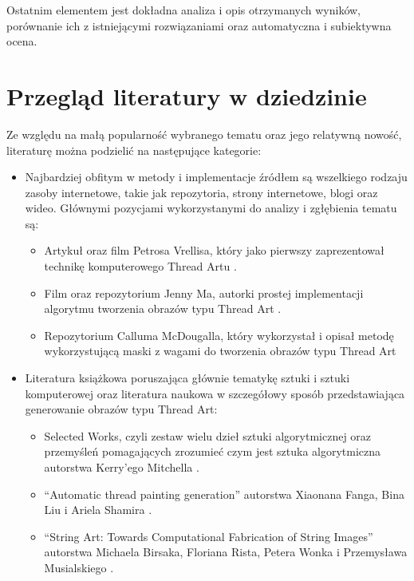     Ostatnim elementem jest dokładna analiza i opis otrzymanych wyników, porównanie ich z istniejącymi rozwiązaniami oraz automatyczna i subiektywna ocena. 

    \section{Przegląd literatury w dziedzinie} \label{intro-literature}
    Ze względu na małą popularność wybranego tematu oraz jego relatywną nowość, literaturę można podzielić na następujące kategorie:
    \begin{itemize}
        \item Najbardziej obfitym w metody i implementacje źródłem są wszelkiego rodzaju zasoby internetowe, takie jak repozytoria, strony internetowe, blogi oraz wideo. Głównymi pozycjami wykorzystanymi do analizy i zgłębienia tematu są:
        \begin{itemize}
            \item Artykuł oraz film Petrosa Vrellisa, który jako pierwszy zaprezentował technikę komputerowego Thread Artu \cite{new-way-to-knit}.
            \item Film oraz repozytorium Jenny Ma, autorki prostej implementacji algorytmu tworzenia obrazów typu Thread Art \cite{jenny-github} \cite{jenny-youtube}.
            \item Repozytorium Calluma McDougalla, który wykorzystał i opisał metodę wykorzystującą maski z wagami do tworzenia obrazów typu Thread Art \cite{callum-github}
        \end{itemize}
        \item Literatura książkowa poruszająca głównie tematykę sztuki i sztuki komputerowej oraz literatura naukowa w szczegółowy sposób przedstawiająca generowanie obrazów typu Thread Art:
        \begin{itemize}
            \item Selected Works, czyli zestaw wielu dzieł sztuki algorytmicznej oraz przemyśleń pomagających zrozumieć czym jest sztuka algorytmiczna autorstwa Kerry'ego Mitchella \cite{selected-works}.
            \item ``Automatic thread painting generation'' autorstwa Xiaonana Fanga, Bina Liu i Ariela Shamira \cite{article-string-art-xiaonan}.
            \item ``String Art: Towards Computational Fabrication of String Images'' autorstwa Michaela Birsaka, Floriana Rista, Petera Wonka i Przemysława Musialskiego \cite{article-string-art-birsak}.

\end{itemize}
\end{itemize}

